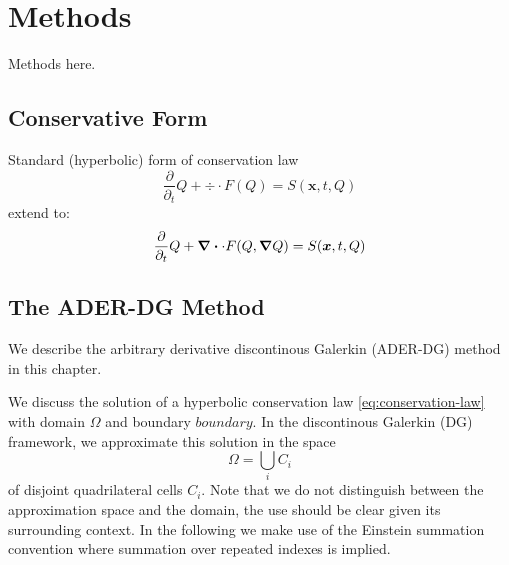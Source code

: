 \chapter{Methods}
Methods here.

\newcommand{\Qrho}{\rho}
\newcommand{\Qj}{\rho \bm{v}}
\newcommand{\Qv}{\bm{v}}
\newcommand{\QE}{\rho E}
\newcommand{\stressT}{\bm{\sigma}}
\newcommand{\pressure}{p}
\newcommand{\maxConvEigen}{\vert \lambda_c^{\text{max}} \vert}
\newcommand{\maxViscEigen}{\vert \lambda_v^{\text{max}} \vert}

\newcommand{\domain}{\Omega}
\newcommand{\broken}{\domain}
\newcommand{\cell}[1][i]{C_{#1}}
\newcommand{\boundary}{\partial \domain}
\newcommand{\sbasis}[1]{\Phi_{#1}}
\newcommand{\testfunction}[1]{\Phi_{#1}}

\section{Conservative Form}
Standard (hyperbolic) form of conservation law
\begin{equation}
  \label{eq:conservation-law}
 \frac{\partial}{\partial_t}  Q + \div \cdot F(Q) = S(\bm{x}, t, Q)
\end{equation}
extend to:
\begin{equation}
  \label{eq:conservation-law-gradient}
 \frac{\partial}{\partial_t}  Q + \div \cdot F(Q, \grad Q) = S(\bm{x}, t, Q)
\end{equation}

\section{The ADER-DG Method}
\label{sec:ader-dg}
We describe the arbitrary derivative discontinous Galerkin (ADER-DG) method in this chapter.

We discuss the solution of a hyperbolic conservation law \cref{eq:conservation-law} with domain $\domain$ and boundary $boundary$.
In the discontinous Galerkin (DG) framework, we approximate this solution in the space
\begin{equation}
  \label{eq:dg-space}
  \broken = \bigcup_i \cell
\end{equation}
of disjoint quadrilateral cells $\cell$.
Note that we do not distinguish between the approximation space and the domain, the use should be clear given its surrounding context.
In the following we make use of the Einstein summation convention where summation over repeated indexes is implied.

